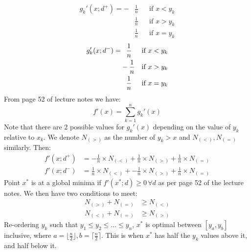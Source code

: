 \documentclass[10pt,a4paper]{article}
\begin{document}
\begin{enumerate}
	\begin{align*}
	g_k'(x; d^+) = -&\frac{1}{n} && \text{if } x < y_k \\
	& \frac{1}{n} && \text{if } x > y_k \\
	& \frac{1}{n} && \text{if } x = y_k
	\end{align*}
	\begin{align*}
	g_k'(x; d^-) = &\hphantom{-}\frac{1}{n} && \text{if } x < y_k \\
	& -\frac{1}{n} && \text{if } x > y_k \\
	& \hphantom{-}\frac{1}{n} && \text{if } x = y_k
	\end{align*}
	From page 52 of lecture notes we have: 
	\begin{equation*}
	f'(x) = \sum_{k=1}^{n} g_k'(x)
	\end{equation*}
	Note that there are 2 possible values for \(g_k'(x)\) depending on the value of \(y_k\) relative to \(x_k\). We denote \(N_{(>)}\) as the number of \(y_k > x\) and \(N_{(<)}, N_{(=)}\) similarly. Then: 
	\begin{align*}
	f'(x; d^+) &= -\frac{1}{n} \times N_{(<)} + \frac{1}{n} \times N_{(>)} + \frac{1}{n} \times N_{(=)} \\
	f'(x; d^-) &= \frac{1}{n} \times N_{(<)} + -\frac{1}{n} \times N_{(>)} + \frac{1}{n} \times N_{(=)}
	\end{align*}
	Point \(x^*\) is at a global minima if \(f'(x^*; d) \geq 0 \, \forall d\) as per page 52 of the lecture notes. We then have two conditions to meet: 
	\begin{align*}
	N_{(>)} + N_{(=)} &\geq N_{(<)} \\
	N_{(<)} + N_{(=)} &\geq N_{(>)}
	\end{align*}
	Re-ordering \(y_k\) such that \(y_1 \leq y_2 \leq \dots \leq y_n\), \(x^*\) is optimal between \([y_a, y_b]\) inclusive, where \(a = \lfloor\frac{n}{2}\rfloor, b = \lceil\frac{n}{2}\rceil\). This is when \(x^*\) has half the \(y_k\) values above it, and half below it.
	
\end{enumerate}

	
\end{document}
